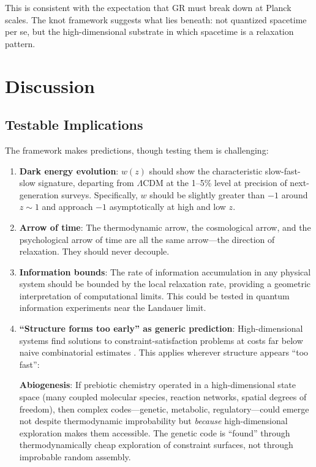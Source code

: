\documentclass[11pt,a4paper]{article}
\begin{document}
This is consistent with the expectation that GR must break down at Planck scales. The knot framework suggests what lies beneath: not quantized spacetime per se, but the high-dimensional substrate in which spacetime is a relaxation pattern.

\section{Discussion}

\subsection{Testable Implications}

The framework makes predictions, though testing them is challenging:

\begin{enumerate}
    \item \textbf{Dark energy evolution}: $w(z)$ should show the characteristic slow-fast-slow signature, departing from $\Lambda$CDM at the 1--5\% level at precision of next-generation surveys. Specifically, $w$ should be slightly greater than $-1$ around $z \sim 1$ and approach $-1$ asymptotically at high and low $z$.

    \item \textbf{Arrow of time}: The thermodynamic arrow, the cosmological arrow, and the psychological arrow of time are all the same arrow---the direction of relaxation. They should never decouple.

    \item \textbf{Information bounds}: The rate of information accumulation in any physical system should be bounded by the local relaxation rate, providing a geometric interpretation of computational limits. This could be tested in quantum information experiments near the Landauer limit.

    \item \textbf{``Structure forms too early'' as generic prediction}: High-dimensional systems find solutions to constraint-satisfaction problems at costs far below naive combinatorial estimates \cite{todd2026intelligence}. This applies wherever structure appears ``too fast'':

    \textbf{Abiogenesis}: If prebiotic chemistry operated in a high-dimensional state space (many coupled molecular species, reaction networks, spatial degrees of freedom), then complex codes---genetic, metabolic, regulatory---could emerge not despite thermodynamic improbability but \emph{because} high-dimensional exploration makes them accessible. The genetic code is ``found'' through thermodynamically cheap exploration of constraint surfaces, not through improbable random assembly.


\end{enumerate}
\end{document}
